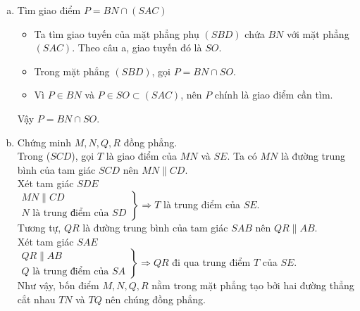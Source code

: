 \begin{ex}
{\begin{enumerate}[a)]
\begin{itemize}
				Vậy, giao tuyến là đường  thẳng \textbf{$SE$}.
			\end{itemize}
			\item Tìm giao điểm $P = BN \cap (SAC)$ 
			\begin{itemize}
				\item Ta tìm giao tuyến của mặt phẳng phụ $(SBD)$ chứa $BN$  với mặt phẳng $(SAC)$. Theo câu a, giao tuyến đó là $SO$.
				\item Trong mặt phẳng  $(SBD)$, gọi $P = BN \cap SO$.
				\item Vì $P \in BN$ và $P \in SO \subset (SAC)$, nên $P$ chính là giao điểm cần tìm. 
			\end{itemize}
			Vậy  $P = BN \cap SO$.
			\item Chứng minh $M,N,Q,R$  đồng phẳng.\\
			Trong ($S C D$), gọi $T$ là giao điểm của $M N$ và $S E$. Ta có $M N$ là đường trung bình của tam giác $S C D$ nên $M N \parallel C  D$.\\ Xét tam giác $S D E$ \\
			$\left.\begin{array}{l}MN \parallel CD \\ N \text { là trung điểm của } S D
	\end{array}\right\} \Rightarrow T$ là trung điểm của $S E$.\\
	Tương tự, $Q R$ là đường trung bình của tam giác $S A B$ nên $Q R \parallel A B$.\\ Xét tam giác $S A E$ \\ $\left.\begin{array}{l}Q R \parallel A B \\ Q \text { là trung điểm của } S A
\end{array}\right\} \Rightarrow Q R$ đi qua trung điểm $T$ của $S E$.\\
Như vậy, bốn điểm $M, N, Q, R$  nằm trong mặt phẳng tạo bởi hai đường thẳng cắt nhau $T N$ và $T Q$ nên chúng đồng phẳng.
\end{enumerate}
 }
\end{ex}

